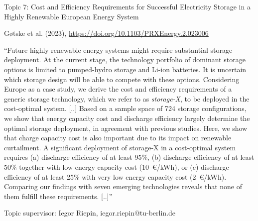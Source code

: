 \documentclass[10pt,aspectratio=169,dvipsnames]{beamer}
\begin{document}
\begin{frame}
  \begin{block}{Topic 7: Cost and Efficiency Requirements for Successful Electricity Storage in a Highly Renewable European Energy System}
      
    Gøtske et al. (2023), \href{https://doi.org/10.1103/PRXEnergy.2.023006}{https://doi.org/10.1103/PRXEnergy.2.023006}
    
    \enquote{Future highly renewable energy systems might require substantial storage deployment. At the current stage, the technology portfolio of dominant storage options is limited to pumped-hydro storage and Li-ion batteries. It is uncertain which storage design will be able to compete with these options. Considering Europe as a case study, we derive the cost and efficiency requirements of a generic storage technology, which we refer to as \emph{storage-X}, to be deployed in the cost-optimal system. [..] Based on a sample space of 724 storage configurations, we show that energy capacity cost and discharge efficiency largely determine the optimal storage deployment, in agreement with previous studies. Here, we show that charge capacity cost is also important due to its impact on renewable curtailment. A significant deployment of storage-X in a cost-optimal system requires (a) discharge efficiency of at least 95\%, (b) discharge efficiency of at least 50\% together with low energy capacity cost (10~€/kWh), or (c) discharge efficiency of at least 25\% with very low energy capacity cost (2~€/kWh). Comparing our findings with seven emerging technologies reveals that none of them fulfill these requirements.  [..]}

    \hfill
    Topic supervisor: Iegor Riepin, iegor.riepin@tu-berlin.de
    
  \end{block}
\end{frame}
\end{document}
